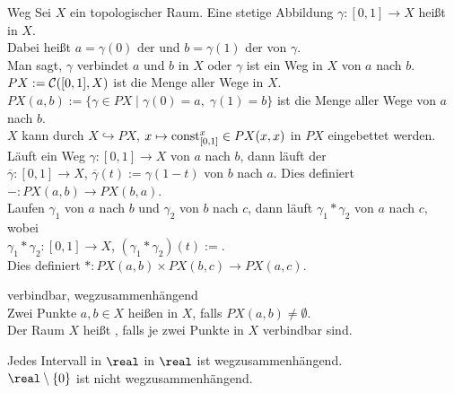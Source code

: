 \begin{Def}{Weg}
    Sei $X$ ein topologischer Raum.
    Eine stetige Abbildung $\gamma\colon [0, 1] \rightarrow X$ heißt
     in $X$. \\
    Dabei heißt $a = \gamma(0)$ der  und
    $b = \gamma(1)$ der  von $\gamma$. \\
    Man sagt, $\gamma$ verbindet $a$ und $b$ in $X$
    oder $\gamma$ ist ein Weg in $X$ von $a$ nach $b$. \\
    $PX := \mathcal{C}([0,1], X)$ ist die Menge aller Wege in $X$. \\
    $PX(a, b) := \{\gamma \in PX \;|\; \gamma(0) = a,\; \gamma(1) = b\}$
    ist die Menge aller Wege von $a$ nach $b$. \\
    $X$ kann durch $X \hookrightarrow PX$,
    $x \mapsto \operatorname{const}_{[0, 1]}^x \in PX(x, x)$ in $PX$ eingebettet werden. \\
    Läuft ein Weg $\gamma\colon [0, 1] \rightarrow X$ von $a$ nach $b$,
    dann läuft der  \\
    $\overline{\gamma}\colon [0, 1] \rightarrow X$,
    $\overline{\gamma}(t) := \gamma(1 - t)$ von $b$ nach $a$.
    Dies definiert $-\colon PX(a, b) \rightarrow PX(b, a)$. \\
    Laufen $\gamma_1$ von $a$ nach $b$ und $\gamma_2$ von $b$ nach $c$, dann
    läuft $\gamma_1 \ast \gamma_2$ von $a$ nach $c$, wobei \\
    $\gamma_1 \ast \gamma_2\colon [0, 1] \rightarrow X$,
    $(\gamma_1 \ast \gamma_2)(t) := $. \\
    Dies definiert $\ast\colon PX(a, b) \times PX(b, c) \rightarrow PX(a, c)$.
\end{Def}

\linie

\begin{Def}{verbindbar, wegzusammenhängend}\\
    Zwei Punkte $a, b \in X$ heißen  in $X$, falls
    $PX(a, b) \not= \emptyset$. \\
    Der Raum $X$ heißt , falls je zwei Punkte in
    $X$ verbindbar sind.
\end{Def}

\begin{Bsp}
    Jedes Intervall in $\real$ in $\real$ ist wegzusammenhängend. \\
    $\real \setminus \{0\}$ ist nicht wegzusammenhängend.
\end{Bsp}

